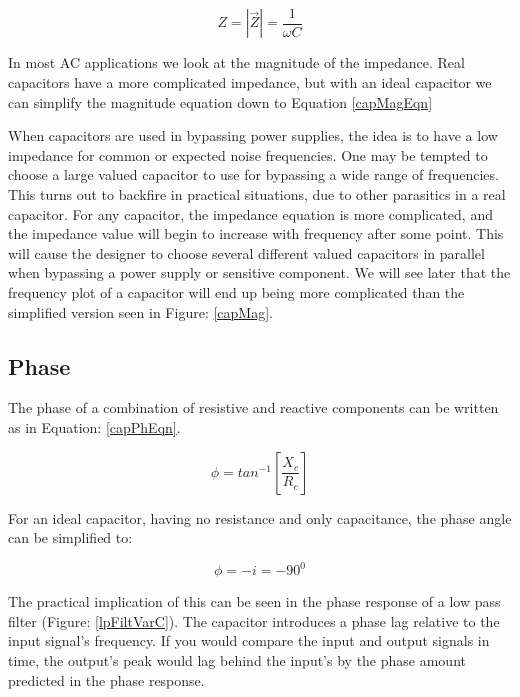 \begin{equation}
\label{capMagEqn}
Z = |\vec{Z}| = \frac{1}{\omega C}
\end{equation}

In most AC applications we look at the magnitude of the impedance. Real capacitors have a more complicated impedance, but with an ideal capacitor we can simplify the magnitude equation down to Equation \eqref{capMagEqn}

When capacitors are used in bypassing power supplies, the idea is to have a low impedance for common or expected noise frequencies. One may be tempted to choose a large valued capacitor to use for bypassing a wide range of frequencies. This turns out to backfire in practical situations, due to other parasitics in a real capacitor. For any capacitor, the impedance equation is more complicated, and the impedance value will begin to increase with frequency after some point. This will cause the designer to choose several different valued capacitors in parallel when bypassing a power supply or sensitive component. We will see later that the frequency plot of a capacitor will end up being more complicated than the simplified version seen in Figure: \ref{capMag}.



\subsection{Phase}

The phase of a combination of resistive and reactive components can be written as in Equation: \eqref{capPhEqn}.

\begin{equation}
\label{capPhEqn}
\phi = tan^{-1}[\frac{X_c}{R_c}]
\end{equation}

For an ideal capacitor, having no resistance and only capacitance, the phase angle can be simplified to:

\begin{equation}
\label{capImpEqu2}
\phi = -i = -90^0
\end{equation}

The practical implication of this can be seen in the phase response of a low pass filter (Figure: \ref{lpFiltVarC}). The capacitor introduces a phase lag relative to the input signal's frequency. If you would compare the input and output signals in time, the output's peak would lag behind the input's by the phase amount predicted in the phase response.


